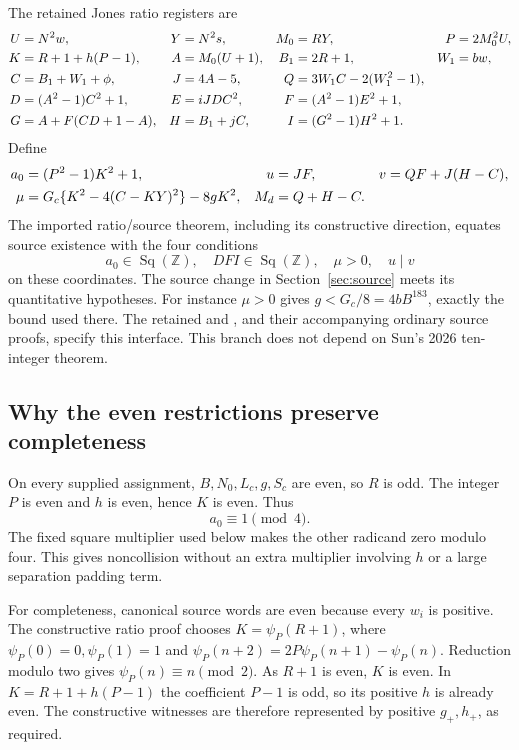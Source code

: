 \documentclass[11pt,a4paper]{article}
\theoremstyle{definition}\newtheorem{definition}[theorem]{Definition}
\theoremstyle{remark}\newtheorem{remark}[theorem]{Remark}
\newcommand{\Z}{\mathbb Z}\newcommand{\N}{\mathbb N}\newcommand{\Pos}{\mathbb Z_{>0}}
\newcommand{\Sq}{\operatorname{Sq}(\Z)}\newcommand{\Con}{\operatorname{Con}}
\newcommand{\code}[1]{\texttt{\small\detokenize{#1}}}
\begin{document}
The retained Jones ratio registers are
\begin{align}
 U&=N^2w,&Y&=N^2s,& M_0&=RY,& P&=2M_0^2U,\notag\\
 K&=R+1+h(P-1),& A&=M_0(U+1),&B_1&=2R+1,&W_1&=bw,\notag\\
 C&=B_1+W_1+\phi,&J&=4A-5,&Q&=3W_1C-2(W_1^2-1),\notag\\
 D&=(A^2-1)C^2+1,&E&=iJDC^2,&F&=(A^2-1)E^2+1,\notag\\
 G&=A+F(CD+1-A),&H&=B_1+jC,&I&=(G^2-1)H^2+1.
 \label{eq:nine-ratio}
\end{align}
Define
\begin{align}
 a_0&=(P^2-1)K^2+1,& u&=JF,& v&=QF+J(H-C),\notag\\
 \mu&=G_c\{K^2-4(C-KY)^2\}-8gK^2,&
 M_d&=Q+H-C.\label{eq:nine-margin}
\end{align}
The imported ratio/source theorem, including its constructive direction,
equates source existence with the four conditions
\begin{equation}\label{eq:four-ratio}
 a_0\in\Sq,\quad DFI\in\Sq,\quad \mu>0,\quad u\mid v
\end{equation}
on these coordinates. The source change in Section~\ref{sec:source} meets
its quantitative hypotheses. For instance $\mu>0$ gives
$g<G_c/8=4bB^{183}$, exactly the bound used there. The retained
\code{Ratio.lean} and \code{NineRatio.lean}, and their accompanying
ordinary source proofs, specify this interface. This branch does not
depend on Sun's 2026 ten-integer theorem.

\subsection{Why the even restrictions preserve completeness}

On every supplied assignment, $B,N_0,L_c,g,S_c$ are even, so $R$ is
odd. The integer $P$ is even and $h$ is even, hence $K$ is even. Thus
\begin{equation}\label{eq:nine-parity}
 a_0\equiv1\pmod4.
\end{equation}
The fixed square multiplier used below makes the other radicand zero
modulo four. This gives noncollision without an extra multiplier involving
$h$ or a large separation padding term.

For completeness, canonical source words are even because every $w_i$ is
positive. The constructive ratio proof chooses
$K=\psi_P(R+1)$, where
$\psi_P(0)=0,\psi_P(1)=1$ and
$\psi_P(n+2)=2P\psi_P(n+1)-\psi_P(n)$. Reduction modulo two gives
$\psi_P(n)\equiv n\pmod2$. As $R+1$ is even, $K$ is even. In
$K=R+1+h(P-1)$ the coefficient $P-1$ is odd, so its positive $h$ is
already even. The constructive witnesses are therefore represented by
positive $g_+,h_+$, as required.
\end{document}
